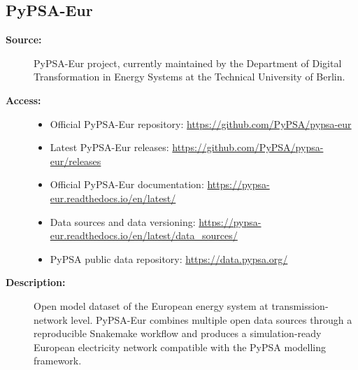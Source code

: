 \subsection{PyPSA-Eur}

\begin{description}

    \item[\textbf{Source:}]
    PyPSA-Eur project, currently maintained by the Department of Digital
    Transformation in Energy Systems at the Technical University of Berlin.

    \item[\textbf{Access:}] \hfill
    \begin{itemize}

        \item Official PyPSA-Eur repository:
        \url{https://github.com/PyPSA/pypsa-eur}

        \item Latest PyPSA-Eur releases:
        \url{https://github.com/PyPSA/pypsa-eur/releases}

        \item Official PyPSA-Eur documentation:
        \url{https://pypsa-eur.readthedocs.io/en/latest/}

        \item Data sources and data versioning:
        \url{https://pypsa-eur.readthedocs.io/en/latest/data_sources/}

        \item PyPSA public data repository:
        \url{https://data.pypsa.org/}

    \end{itemize}

    \item[\textbf{Description:}]
    Open model dataset of the European energy system at transmission-network
    level. PyPSA-Eur combines multiple open data sources through a reproducible
    Snakemake workflow and produces a simulation-ready European electricity
    network compatible with the PyPSA modelling framework.


\end{description}

